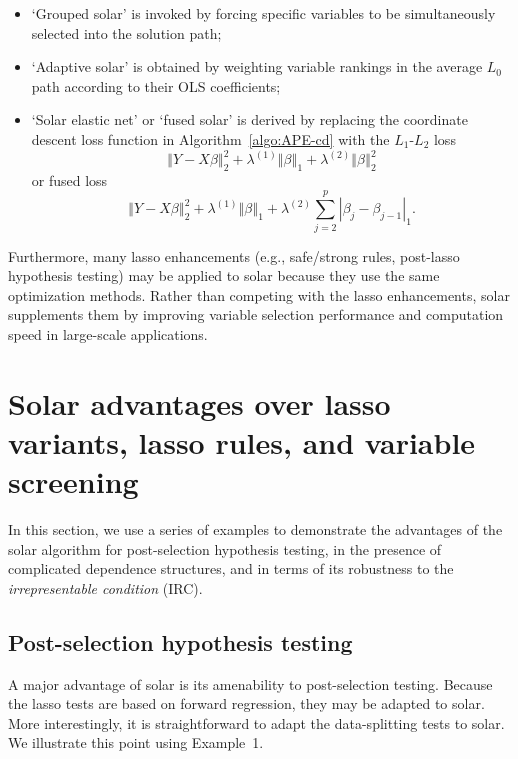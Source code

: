 \documentclass[11pt,review,authoryear]{elsarticle}
\begin{document}
\begin{itemize}
  \item `Grouped solar' is invoked by forcing specific variables to be simultaneously selected into the solution path;
  \item `Adaptive solar' is obtained by weighting variable rankings in the average $L_0$ path according to their OLS coefficients;
  \item `Solar elastic net' or `fused solar' is derived by replacing the coordinate descent loss function in Algorithm~\ref{algo:APE-cd} with the $L_1$-$L_2$ loss
    \begin{equation}
      \left\Vert Y -X\beta \right\Vert_2^2 + \lambda^{(1)} \left\Vert \beta \right\Vert_1 + \lambda^{(2)} \left\Vert \beta \right\Vert_2^2
    \end{equation}
    or fused loss
    \begin{equation}
      \left\Vert Y -X\beta \right\Vert_2^2 + \lambda^{(1)} \left\Vert \beta \right\Vert_1 + \lambda^{(2)} \sum_{j=2}^{p} \left\vert \beta_j - \beta_{j-1} \right\vert_1.
    \end{equation}
\end{itemize}

Furthermore, many lasso enhancements (e.g., safe/strong rules, post-lasso hypothesis testing) may be applied to solar because they use the same optimization methods. Rather than competing with the lasso enhancements, solar supplements them by improving variable selection performance and computation speed in large-scale applications.

\section{Solar advantages over lasso variants, lasso rules, and variable screening \label{section:adv}}

In this section, we use a series of examples to demonstrate the advantages of the solar algorithm for post-selection hypothesis testing, in the presence of complicated dependence structures, and in terms of its robustness to the \emph{irrepresentable condition} (IRC).

\subsection{Post-selection hypothesis testing}

A major advantage of solar is its amenability to post-selection testing. Because the lasso tests \citep{lockhartall14, taylor2014exact} are based on forward regression, they may be adapted to solar. More interestingly, it is straightforward to adapt the data-splitting tests \citep{wasserman2009high,meinshausen2009p} to solar. We illustrate this point using Example~1.
\end{document}
